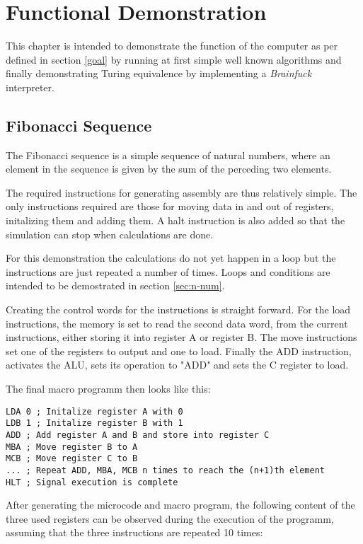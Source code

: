 \chapter{Functional Demonstration}
This chapter is intended to demonstrate the function of the computer as per defined in section \ref{goal} by running at first simple well known algorithms and finally demonstrating Turing equivalence by implementing a \textit{Brainfuck} interpreter. %




\section{Fibonacci Sequence}
The Fibonacci sequence is a simple sequence of natural numbers, where an element in the sequence is given by the sum of the perceding two elements.

The required instructions for generating assembly are thus relatively simple. The only instructions required are those for moving data in and out of registers, initalizing them and adding them. A halt instruction is also added so that the simulation can stop when calculations are done. 

For this demonstration the calculations do not yet happen in a loop but the instructions are just repeated a number of times. Loops and conditions are intended to be demostrated in section \ref{sec:n-num}.

Creating the control words for the instructions is straight forward. For the load instructions, the memory is set to read the second data word, from the current instructions, either storing it into register A or register B. The move instructions set one of the registers to output and one to load. Finally the ADD instruction, activates the ALU, sets its operation to "ADD" and sets the C register to load. 

The final macro programm then looks like this: 
\begin{lstlisting}[language={[x86masm]Assembler}, caption=Assembly code to calculate assembly, label=lst:fib]
LDA 0 ; Initalize register A with 0
LDB 1 ; Initalize register B with 1
ADD ; Add register A and B and store into register C
MBA ; Move register B to A
MCB ; Move register C to B
... ; Repeat ADD, MBA, MCB n times to reach the (n+1)th element
HLT ; Signal execution is complete
\end{lstlisting}

After generating the microcode and macro program, the following content of the three used registers can be observed during the execution of the programm, assuming that the three instructions are repeated 10 times:

